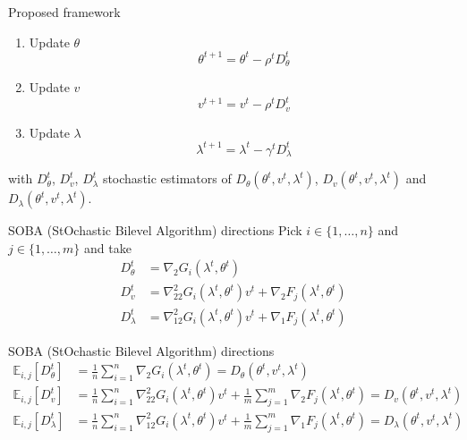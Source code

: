 \documentclass{beamer}
\begin{document}
\begin{frame}{Proposed framework}
\begin{algorithm}[H]
     {
     \begin{enumerate}
         \item Update $\theta$
         $$\theta^{t+1} = \theta^t - \rho^t D^t_\theta$$

         \item Update $v$
         $$v^{t+1} = v^t - \rho^t D^t_v$$

        \item Update $\lambda$
         $$\lambda^{t+1} = \lambda^t - \gamma^t D^t_\lambda$$
    \end{enumerate}
    }
\end{algorithm}
with $D^t_\theta$, $D^t_v$, $D^t_\lambda$ stochastic estimators of $D_\theta(\theta^t, v^t, \lambda^t)$, $D_v(\theta^t, v^t, \lambda^t)$ and $D_\lambda(\theta^t, v^t, \lambda^t)$.

\end{frame}


\begin{frame}{SOBA (StOchastic Bilevel Algorithm) directions}
    Pick $i\in\{1,\dots,n\}$ and $j\in\{1,\dots,m\}$ and take
    \vspace{.5cm}
    \begin{align*}
        D_\theta^t &= \nabla_2 G_i(\lambda^t, \theta^t) \\
        D_v^t &= \nabla^2_{22} G_i(\lambda^t, \theta^t)v^t + \nabla_2 F_j(\lambda^t, \theta^t) \\
        D_\lambda^t &= \nabla^2_{12} G_i(\lambda^t, \theta^t)v^t + \nabla_1 F_j(\lambda^t, \theta^t)
    \end{align*}
\end{frame}

\begin{frame}{SOBA (StOchastic Bilevel Algorithm) directions}
    \begin{align*}
        \mathbb E_{i,j}[D_\theta^t] &= \frac1n\sum_{i=1}^n\nabla_2 G_i(\lambda^t, \theta^t) = D_\theta(\theta^t, v^t, \lambda^t) \\
        \mathbb E_{i,j}[D_v^t] &= \frac1n\sum_{i=1}^n\nabla^2_{22} G_i(\lambda^t, \theta^t)v^t + \frac1m\sum_{j=1}^m\nabla_2 F_j(\lambda^t, \theta^t) = D_v(\theta^t, v^t, \lambda^t) \\
        \mathbb E_{i,j}[D_\lambda^t] &= \frac1n\sum_{i=1}^n\nabla^2_{12} G_i(\lambda^t, \theta^t)v^t + \frac1m\sum_{j=1}^m\nabla_1 F_j(\lambda^t, \theta^t) = D_\lambda(\theta^t, v^t, \lambda^t)
    \end{align*}
\end{frame}
\end{document}
